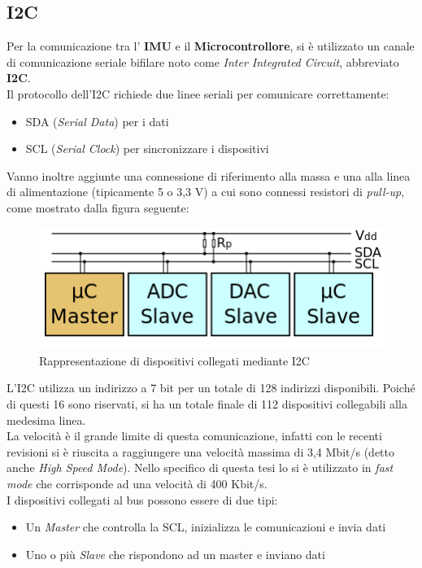 \subsection{I2C}
\label{imp_i2c}
Per la comunicazione tra l' \textbf{IMU} e il \textbf{Microcontrollore}, si è utilizzato un canale di comunicazione seriale bifilare noto come \textit{Inter Integrated Circuit}, abbreviato \textbf{I2C}.\\
Il protocollo \cite{i2cWiki} dell'I2C richiede due linee seriali per comunicare correttamente:
\begin{itemize}
\item SDA (\textit{Serial Data}) per i dati
\item SCL (\textit{Serial Clock}) per sincronizzare i dispositivi
\end{itemize}
Vanno inoltre aggiunte una connessione di riferimento alla massa e una alla linea di alimentazione (tipicamente 5 o 3,3 V) a cui sono connessi resistori di \textit{pull-up}, come mostrato dalla figura seguente:
\begin{figure}[H]  
	\centering 
	\includegraphics[scale=0.6]{implementazione/i2c.png}
	\caption{Rappresentazione di dispositivi collegati mediante I2C}
	\label{fig:i2c}
\end{figure}
L'I2C utilizza un indirizzo a 7 bit per un totale di 128 indirizzi disponibili. Poiché di questi 16 sono riservati, si ha un totale finale di 112 dispositivi collegabili alla medesima linea.\\
La velocità è il grande limite di questa comunicazione, infatti con le recenti revisioni si è riuscita a raggiungere una velocità massima di 3,4 Mbit/s (detto anche \textit{High Speed Mode}). Nello specifico di questa tesi lo si è utilizzato in \textit{fast mode} che corrisponde ad una velocità di 400 Kbit/s.\\
I dispositivi collegati al bus possono essere di due tipi:
\begin{itemize}
\item Un \textit{Master} che controlla la SCL, inizializza le comunicazioni e invia dati
\item Uno o più \textit{Slave} che rispondono ad un master e inviano dati
\end{itemize}

